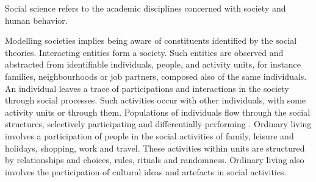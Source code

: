 \documentclass[11pt,oneside,a4paper,openright]{report}
\begin{document}
Social science refers to the academic disciplines concerned with society and human behavior\cite[p.7,chap.3]{MWilliams1999}.
 
Modelling societies implies being aware of constituents identified by the social theories. Interacting entities form a society. Such entities are observed and abstracted from identifiable individuals, people, and activity units, for instance families, neighbourhoods or job partners, composed also of the same individuals. An individual leaves a trace of participations and interactions in the society through social processes. Such activities occur with other individuals, with some activity units or through them. Populations of individuals flow through the social structures, selectively participating and differentially performing \cite[p.8]{GordonBurt2010}. 
Ordinary living involves a participation of people in the social activities of family, leisure and holidays, shopping, work and travel. These activities within units are structured by relationships and choices, rules, rituals and randomness. Ordinary living also involves the participation of cultural ideas and artefacts in social activities.
\end{document}

